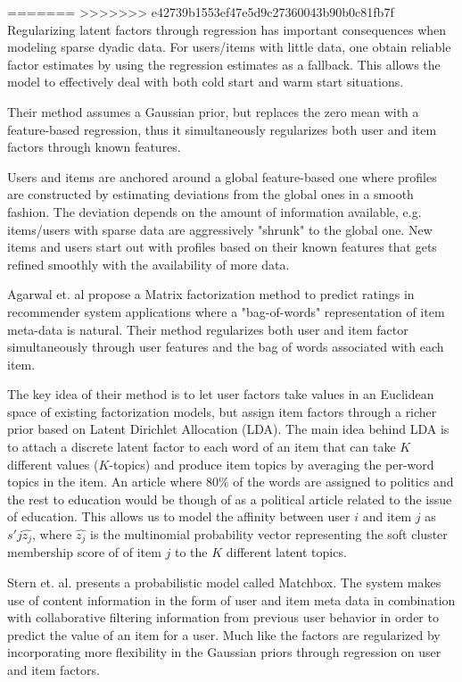 =======
>>>>>>> e42739b1553ef47e5d9c27360043b90b0c81fb7f
Regularizing latent factors through regression has important consequences when modeling sparse dyadic data. For users/items with little data, one obtain reliable factor estimates by using the regression estimates as a fallback. This allows the model to effectively deal with both cold start and warm start situations.

Their method assumes a Gaussian prior, but replaces the zero mean with a feature-based regression, thus it simultaneously regularizes both user and item factors through known features. 

Users and items are anchored around a global feature-based one where profiles are constructed by estimating deviations from the global ones in a smooth fashion. The deviation depends on the amount of information available, e.g. items/users with sparse data are aggressively "shrunk" to the global one. New items and users start out with profiles based on their known features that gets refined smoothly with the availability of more data. %


Agarwal et. al \cite{Agarwal2010} propose a Matrix factorization method to predict ratings in recommender system
applications where a "bag-of-words" representation of item meta-data is natural. Their method regularizes both user and item factor simultaneously through user features and the bag of words associated with each item.

The key idea of their method is to let user factors take values in an Euclidean space of existing factorization models, but assign item factors through a richer prior based on Latent Dirichlet Allocation (LDA). The main idea behind LDA is to attach a discrete latent factor to each word of an item that can take $K$ different values ($K$-topics) and produce item topics by averaging the per-word topics in the item. An article where 80$\%$ of the words are assigned to politics and the rest to education would be though of as a political article related to the issue of education. This allows us to model the affinity between user $i$ and item $j$ as $s'{j}\hat{z_{j}}$, where $\hat{z_{j}}$ is the multinomial probability vector representing the soft cluster membership score of of item $j$ to the $K$ different latent topics.


Stern et. al. \cite{Stern2009} presents a probabilistic model called Matchbox. The system makes use of content information in the form of user and
item meta data in combination with collaborative filtering information from previous user behavior in order to predict the value of an item for a user. Much like \cite{Agarwal2009} the factors are regularized by incorporating more flexibility in the Gaussian priors through regression on user and item factors.

